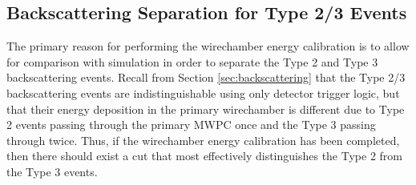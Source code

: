 \subsection{Backscattering Separation for Type 2/3 Events} \label{sssec:backscSep}
The primary reason for performing the wirechamber energy calibration is to allow
for comparison with simulation in order to separate the Type 2 and Type 3 backscattering events. Recall from Section
\ref{sec:backscattering} that the Type 2/3 backscattering events are
indistinguishable using only detector trigger logic, but that their energy
deposition in the primary wirechamber is different due to Type 2 events passing
through the primary MWPC once and the Type 3 passing through twice. Thus, if the wirechamber
energy calibration has been completed, then there should exist a cut that most effectively
distinguishes the Type 2 from the Type 3 events.


